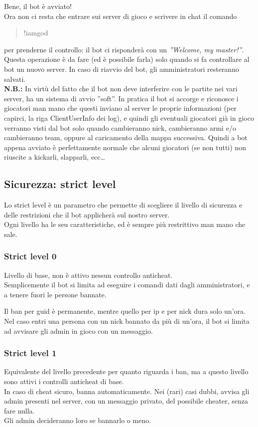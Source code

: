 \documentclass[a4paper]{article}
\begin{document}
Bene, il bot \`e avviato!\\

Ora non ci resta che entrare sui server di gioco e scrivere in chat il comando
\begin{quote}
!iamgod
\end{quote}
per prenderne il controllo: il bot ci risponder\`a con un \textit{''Welcome, my master!''}. Questa operazione \`e da fare (ed \`e possibile farla) solo quando si fa controllare al bot un nuovo server. In caso di riavvio del bot, gli amministratori resteranno salvati.\\

\textbf{N.B.:}
In virt\`u del fatto che il bot non deve interferire con le partite nei vari server, ha un sistema di avvio ''soft''. In pratica il bot si accorge e riconosce i giocatori man mano che questi inviano al server le proprie informazioni (per capirci, la riga ClientUserInfo dei log), e quindi gli eventuali giocatori gi\`a in gioco verranno visti dal bot solo quando cambieranno nick, cambieranno armi e/o cambieranno team, oppure al caricamento della mappa successiva.
Quindi a bot appena avviato \`e perfettamente normale che alcuni giocatori (se non tutti) non riuscite a kickarli, slapparli, ecc\dots

\newpage
\subsection{Sicurezza: strict level}
Lo strict level \`e un parametro che permette di scegliere il livello di sicurezza e delle restrizioni che il bot applicher\`a sul nostro server.\\
Ogni livello ha le seu caratteristiche, ed \`e sempre pi\`u restrittivo man mano che sale.
\subsubsection{Strict level 0}
Livello di base, non \`e attivo nessun controllo anticheat.\\
Semplicemente il bot si limita ad eseguire i comandi dati dagli amministratori, e a tenere fuori le persone bannate.

Il ban per guid \`e permanente, mentre quello per ip e per nick dura solo un'ora. Nel caso entri una persona con un nick bannato da pi\`u di un'ora, il bot si limita ad avvisare gli admin in gioco con un messaggio.
\subsubsection{Strict level 1}
Equivalente del livello precedente per quanto riguarda i ban, ma a questo livello sono attivi i controlli anticheat di base.\\
In caso di cheat sicuro, banna automaticamente. Nei (rari) casi dubbi, avvisa gli admin presenti nel server, con un messaggio privato, del possibile cheater, senza fare nulla.\\
Gli admin decideranno loro se bannarlo o meno.
\end{document}
